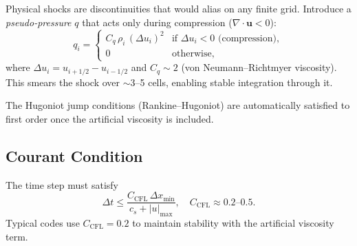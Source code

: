 Physical shocks are discontinuities that would alias on any finite
grid.  Introduce a \emph{pseudo-pressure} $q$ that acts only during
compression ($\nabla\cdot\mathbf{u} < 0$):
\begin{equation}
  q_i = \begin{cases}
    C_q\,\rho_i\,(\Delta u_i)^2 & \text{if } \Delta u_i < 0 \text{ (compression)},\\
    0 & \text{otherwise},
  \end{cases}
  \label{eq:lec19:artvis}
\end{equation}
where $\Delta u_i = u_{i+1/2} - u_{i-1/2}$ and $C_q \sim 2$
(von Neumann–Richtmyer viscosity).  This smears the shock over
$\sim 3$–5 cells, enabling stable integration through it.

The Hugoniot jump conditions (Rankine–Hugoniot) are automatically
satisfied to first order once the artificial viscosity is included.

\subsection{Courant Condition}\label{subsec:lec19:courant}

The time step must satisfy
\begin{equation}
  \Delta t \le \frac{C_\text{CFL}\,\Delta x_\text{min}}{c_s + |u|_\text{max}},
  \quad C_\text{CFL} \approx 0.2\text{--}0.5.
  \label{eq:lec19:courant}
\end{equation}
Typical codes use $C_\text{CFL} = 0.2$ to maintain stability with
the artificial viscosity term.

